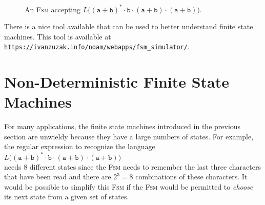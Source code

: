  \begin{figure}[!ht]
   \centering
    \caption{An \textsc{Fsm} accepting
             $L\bigl((\texttt{a}+\texttt{b})^* \cdot \texttt{b} \cdot (\texttt{a}+\texttt{b}) \cdot (\texttt{a}+\texttt{b})\bigr)$.}
   \label{fig:abstarbabab.dot}
 \end{figure}

\remarkEng
There is a nice tool available that can be used to better understand finite state machines.  This
tool is available at
\\[0.2cm]
\hspace*{1.3cm}
\href{https://ivanzuzak.info/noam/webapps/fsm_simulator/}{\texttt{https://ivanzuzak.info/noam/webapps/fsm\_simulator/}}.


\section{Non-Deterministic Finite State Machines}
For many applications, the finite state machines introduced in the previous section are unwieldy
because they have a large numbers of states.  For example, the regular expression to recognize the language
\\[0.2cm]
\hspace*{1.3cm}
$L\bigl((\texttt{a}+\texttt{b})^* \cdot \texttt{b} \cdot (\texttt{a}+\texttt{b}) \cdot (\texttt{a}+\texttt{b})\bigr)$ 
\\[0.2cm]
needs 8 different states since the \textsc{Fsm} needs to remember the last three characters that
have been read and there are $2^3 = 8$ combinations of these characters.  
It would be possible to simplify this \textsc{Fsm} if the \textsc{Fsm} would be permitted to \emph{choose} its
next state from a given set of states.


